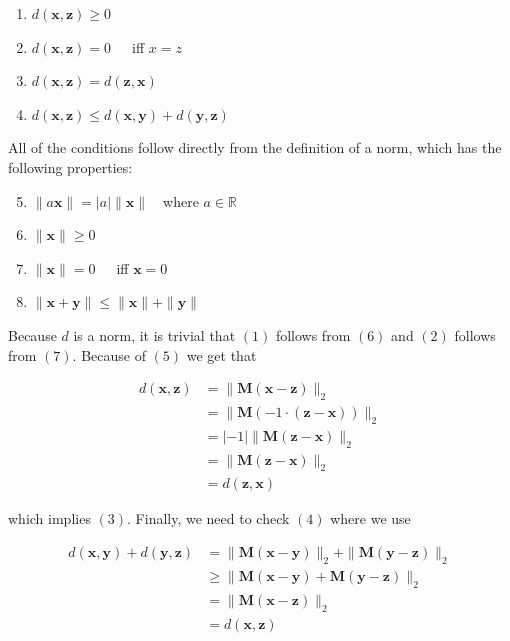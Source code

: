 \documentclass[11pt,a4paper]{article}
\begin{document}
\begin{enumerate}
    \item $d(\bm{x},\bm{z}) \geq 0$
    \item $d(\bm{x},\bm{z}) = 0$\ \ \ iff $x = z$
    \item $d(\bm{x},\bm{z}) = d(\bm{z},\bm{x})$
    \item $d(\bm{x},\bm{z}) \leq d(\bm{x},\bm{y}) + d(\bm{y},\bm{z})$
\end{enumerate}

All of the conditions follow directly from the definition of a norm, which has the
following properties:

\begin{enumerate}
    \setcounter{enumi}{4}
    \item $\| a\bm{x}\| = |a|\| \bm{x} \|$\ \ where $a \in \mathbb{R}$
    \item $\| \bm{x} \| \geq 0$
    \item $\| \bm{x} \| = 0$\ \ \ iff $\bm{x} = 0$
    \item $\| \bm{x} + \bm{y} \| \leq \| \bm{x} \| + \| \bm{y} \|$
\end{enumerate}

Because $d$ is a norm, it is trivial that $(1)$ follows from $(6)$ and $(2)$ follows from $(7)$. Because of $(5)$ we get that 

\begin{align*}
    d(\bm{x}, \bm{z}) &= \| \bm{M}(\bm{x} - \bm{z}) \|_{2} \\
                      &= \| \bm{M}(-1\cdot(\bm{z} - \bm{x})) \|_{2} \\
                      &= |-1|\| \bm{M}(\bm{z} - \bm{x}) \|_{2} \tag{per 5}\\
                      &= \| \bm{M}(\bm{z} - \bm{x}) \|_{2} \\
                      &= d(\bm{z},\bm{x})
\end{align*}

which implies $(3)$. Finally, we need to check $(4)$ where we use

\begin{align*}
d(\bm{x}, \bm{y}) + 
d(\bm{y}, \bm{z}) &= \| \bm{M}(\bm{x} - \bm{y}) \|_{2} + \| \bm{M}(\bm{y} - \bm{z}) \|_{2} \\
                  &\geq \| \bm{M}(\bm{x} - \bm{y}) +  \bm{M}(\bm{y} - \bm{z}) \|_{2} \tag{per 8}\\
                  &= \| \bm{M}(\bm{x} - \bm{z}) \|_{2} \\
                  &= d(\bm{x},\bm{z})
\end{align*}
\end{document}
